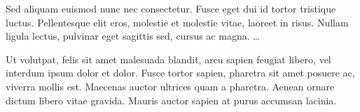 \documentclass[
journal=jacsat, %
manuscript=article]{achemso}
\begin{document}
\acknowledgement

Sed aliquam euismod nunc nec consectetur. Fusce eget dui id tortor tristique luctus. Pellentesque elit eros, molestie et molestie vitae, laoreet in risus. Nullam ligula lectus, pulvinar eget sagittis sed, cursus ac magna. \ldots


\suppinfo

Ut volutpat, felis sit amet malesuada blandit, arcu sapien feugiat libero, vel interdum ipsum dolor et dolor. Fusce tortor sapien, pharetra sit amet posuere ac, viverra mollis est. Maecenas auctor ultrices quam a pharetra. Aenean ornare dictum libero vitae gravida. Mauris auctor sapien at purus accumsan lacinia.


\end{document}
